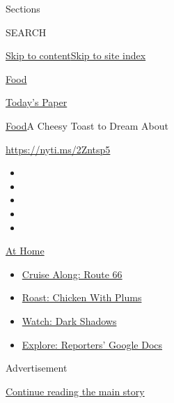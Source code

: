 Sections

SEARCH

\protect\hyperlink{site-content}{Skip to
content}\protect\hyperlink{site-index}{Skip to site index}

\href{https://www.nytimes3xbfgragh.onion/section/food}{Food}

\href{https://myaccount.nytimes3xbfgragh.onion/auth/login?response_type=cookie\&client_id=vi}{}

\href{https://www.nytimes3xbfgragh.onion/section/todayspaper}{Today's
Paper}

\href{/section/food}{Food}\textbar{}A Cheesy Toast to Dream About

\url{https://nyti.ms/2Zntsp5}

\begin{itemize}
\item
\item
\item
\item
\item
\end{itemize}

\href{https://www.nytimes3xbfgragh.onion/spotlight/at-home?action=click\&pgtype=Article\&state=default\&region=TOP_BANNER\&context=at_home_menu}{At
Home}

\begin{itemize}
\tightlist
\item
  \href{https://www.nytimes3xbfgragh.onion/2020/09/07/travel/route-66.html?action=click\&pgtype=Article\&state=default\&region=TOP_BANNER\&context=at_home_menu}{Cruise
  Along: Route 66}
\item
  \href{https://www.nytimes3xbfgragh.onion/2020/09/04/dining/sheet-pan-chicken.html?action=click\&pgtype=Article\&state=default\&region=TOP_BANNER\&context=at_home_menu}{Roast:
  Chicken With Plums}
\item
  \href{https://www.nytimes3xbfgragh.onion/2020/09/04/arts/television/dark-shadows-stream.html?action=click\&pgtype=Article\&state=default\&region=TOP_BANNER\&context=at_home_menu}{Watch:
  Dark Shadows}
\item
  \href{https://www.nytimes3xbfgragh.onion/interactive/2020/at-home/even-more-reporters-editors-diaries-lists-recommendations.html?action=click\&pgtype=Article\&state=default\&region=TOP_BANNER\&context=at_home_menu}{Explore:
  Reporters' Google Docs}
\end{itemize}

Advertisement

\protect\hyperlink{after-top}{Continue reading the main story}

